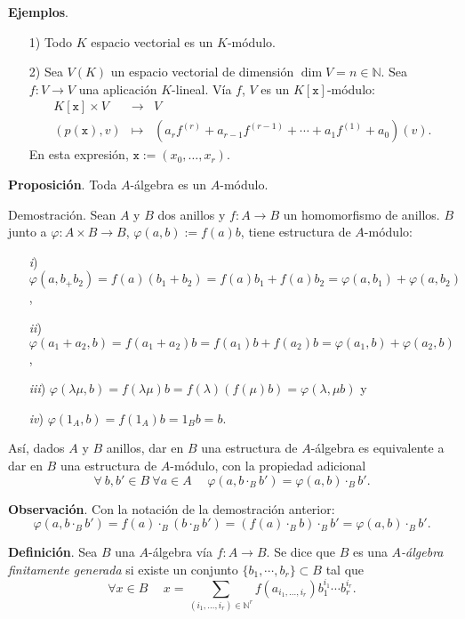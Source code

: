 \documentclass[a4paper,12pt]{article}
\newcommand{\N}{\mathbb{N}}
\newcommand{\x}{\texttt{x}}
\begin{document}
\textbf{Ejemplos}.\begin{itemize}
    \item[1)] Todo $K$ espacio vectorial es un $K$-módulo.
    \item[2)] Sea $V(K)$ un espacio vectorial de dimensión $\dim V=n\in\N$. Sea $f: V\longrightarrow V$ una aplicación $K$-lineal. Vía $f$, $V$ es un $K[\x]$-módulo:$$\begin{array}{rcl}
    K[\x]\times V&\longrightarrow&V\\
    (p(\x),v)&\longmapsto&\left(a_rf^{(r)}+a_{r-1}f^{(r-1)}+\cdots+a_{1}f^{(1)}+a_0\right)(v).
    \end{array}$$
    En esta expresión, $\x:=(x_0,\dots,x_r)$.
\end{itemize}
\textbf{Proposición}. Toda $A$-álgebra es un $A$-módulo.

Demostración. Sean $A$ y $B$ dos anillos y $f: A\longrightarrow B$ un homomorfismo de anillos. $B$ junto a $\varphi: A\times B\longrightarrow B$, $\varphi(a,b):=f(a)b$, tiene estructura de $A$-módulo:\begin{itemize}
    \item [\textit{i})]$\varphi(a,b_+b_2)=f(a)(b_1+b_2)=f(a)b_1+f(a)b_2=\varphi(a,b_1)+\varphi(a,b_2)$,
    \item[\textit{ii})]$\varphi(a_1+a_2,b)=f(a_1+a_2)b=f(a_1)b+f(a_2)b=\varphi(a_1,b)+\varphi(a_2,b)$,
    \item[\textit{iii})]$\varphi(\lambda\mu,b)=f(\lambda\mu)b=f(\lambda)(f(\mu)b)=\varphi(\lambda,\mu b)$ y
    \item[\textit{iv})]$\varphi(1_A,b)=f(1_A)b=1_Bb=b$.
\end{itemize}
Así, dados $A$ y $B$ anillos, dar en $B$ una estructura de $A$-álgebra es equivalente a dar en $B$ una estructura de $A$-módulo, con la propiedad adicional\begin{equation} \label{eqn:v} \forall\ b,b'\in B\ \forall a\in A\hspace{15pt} \varphi(a,b\cdot_B b')=\varphi(a, b)\cdot_B b'.\end{equation}

\textbf{Observación}. Con la notación de la demostración anterior:$$\varphi(a,b\cdot_B b')=f(a)\cdot_B(b\cdot_B b')=(f(a)\cdot_B b)\cdot_B b'=\varphi(a,b)\cdot_B b'.$$

\textbf{Definición}. Sea $B$ una $A$-álgebra vía $f: A\longrightarrow B$. Se dice que $B$ es una \textit{$A$-álgebra finitamente generada} si existe un conjunto $\{b_1,\cdots,b_r\}\subset B$ tal que$$\forall x\in B\hspace{15pt}x=\sum_{(i_1,\dots,i_r)\in{\N}^r}f(a_{i_1,\dots,i_r})b_1^{i_1}\cdots b_r^{i_r}.$$
\end{document}
